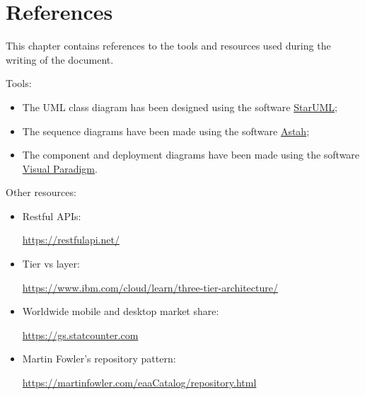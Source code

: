 \documentclass[a4paper,oneside,11pt]{book}
\begin{document}
\chapter{References}
    This chapter contains references to the tools and resources used during the writing of the document. \par
    Tools:
    \begin{itemize}
        \item The UML class diagram has been designed using the software \href{https://staruml.io/}{StarUML};
        \item The sequence diagrams have been made using the software \href{https://astah.net/}{Astah};
        \item The component and deployment diagrams have been made using the software \href{https://www.visual-paradigm.com/}{Visual Paradigm}.
    \end{itemize}
    Other resources:
    \begin{itemize}
        \item Restful APIs: \par \small{\url{https://restfulapi.net/}}
        \item Tier vs layer: \par \small{\url{https://www.ibm.com/cloud/learn/three-tier-architecture/}}
        \item Worldwide mobile and desktop market share: \par \small{\url{https://gs.statcounter.com}}
        \item Martin Fowler's repository pattern: \par \small{\url{https://martinfowler.com/eaaCatalog/repository.html}}
    \end{itemize}

\listoftables
\listoffigures
\end{document}
